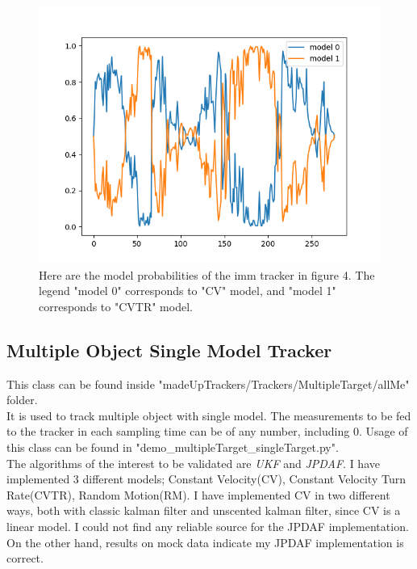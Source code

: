 \documentclass[peerreview]{IEEEtran}
\begin{document}
\begin{figure}[htbp]
\centerline{\includegraphics[scale=.5]{immProbabilities.png}}
\caption{Here are the model probabilities of the imm tracker in figure 4. The legend "model 0" corresponds to "CV" model, and "model 1" corresponds to "CVTR" model.}
\label{fig}
\end{figure}



\subsection{Multiple Object Single Model Tracker}
This class can be found inside "madeUpTrackers/Trackers/MultipleTarget/allMe" folder. \\

It is used to track multiple object with single model. The measurements to be fed to the tracker in each sampling time can be of any number, including 0. Usage of this class can be found in "demo\_multipleTarget\_singleTarget.py". \\

The algorithms of the interest to be validated are \emph{UKF} and \emph{JPDAF}. I have implemented 3 different models; Constant Velocity(CV), Constant Velocity Turn Rate(CVTR), Random Motion(RM). I have implemented CV in two different ways, both with classic kalman filter and  unscented kalman filter, since CV is a linear model. I could not find any reliable source for the JPDAF implementation. On the other hand, results on mock data indicate my JPDAF implementation is correct.
\end{document}
